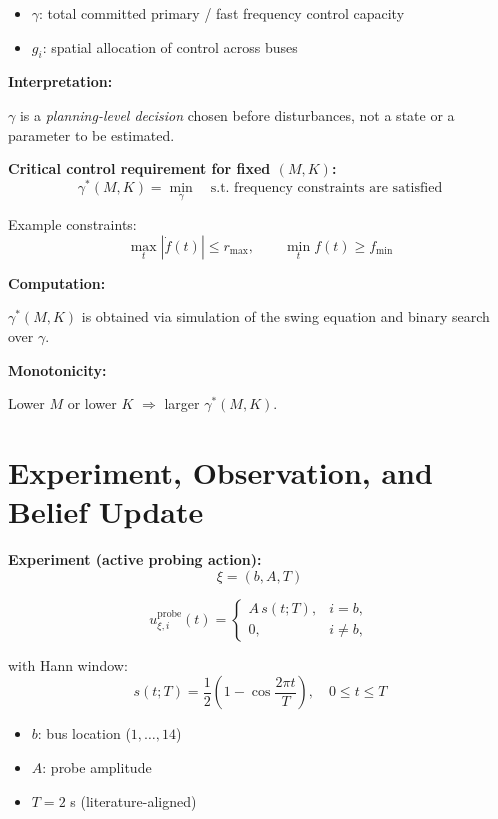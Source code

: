 \begin{itemize}
  \item $\gamma$: total committed primary / fast frequency control capacity
  \item $g_i$: spatial allocation of control across buses
\end{itemize}

\vspace{0.3em}
\textbf{Interpretation:}

$\gamma$ is a \emph{planning-level decision} chosen before disturbances,
not a state or a parameter to be estimated.

\vspace{0.4em}
\textbf{Critical control requirement for fixed $(M,K)$:}
\[
\gamma^*(M,K)
=
\min_{\gamma}
\quad \text{s.t. frequency constraints are satisfied}
\]

Example constraints:
\[
\max_t |\dot{f}(t)| \le r_{\max},
\qquad
\min_t f(t) \ge f_{\min}
\]

\textbf{Computation:}

$\gamma^*(M,K)$ is obtained via simulation of the swing equation
and binary search over $\gamma$.

\vspace{0.3em}
\textbf{Monotonicity:}

Lower $M$ or lower $K$ $\Rightarrow$ larger $\gamma^*(M,K)$.

\newpage
\section*{Experiment, Observation, and Belief Update}

\textbf{Experiment (active probing action):}
\[
\xi = (b,A,T)
\]

\[
u^{\text{probe}}_{\xi,i}(t)=
\begin{cases}
A\,s(t;T), & i=b,\\
0, & i\neq b,
\end{cases}
\]

with Hann window:
\[
s(t;T)=
\frac{1}{2}\left(1-\cos\frac{2\pi t}{T}\right),\quad 0\le t\le T
\]

\begin{itemize}
  \item $b$: bus location ($1,\dots,14$)
  \item $A$: probe amplitude
  \item $T=2$ s (literature-aligned)
\end{itemize}

